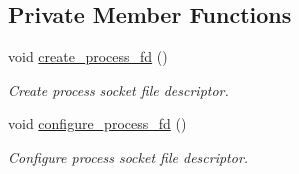 \subsection*{Private Member Functions}
\begin{DoxyCompactItemize}
\item 
void \hyperlink{classdistributed__system_1_1IPC_adc5e10cc2794eaaf9cb71027024e564b}{create\+\_\+process\+\_\+fd} ()
\begin{DoxyCompactList}\small\item\em Create process socket file descriptor. \end{DoxyCompactList}\item 
void \hyperlink{classdistributed__system_1_1IPC_ac66af492ce97beaa2d384e584bcfed6a}{configure\+\_\+process\+\_\+fd} ()
\begin{DoxyCompactList}\small\item\em Configure process socket file descriptor. \end{DoxyCompactList}\end{DoxyCompactItemize}
